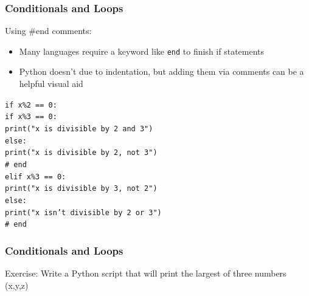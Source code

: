 \documentclass{beamer}
\newcommand{\code}[1]{\texttt{#1}}
\newcommand{\tab}{\hspace*{22pt}}
\begin{document}
\begin{frame}%
	\frametitle{Conditionals and Loops}
	
	\begin{block}{Using \#end comments:}
		\begin{itemize}
			\item Many languages require a keyword like \code{end} to finish if statements
			\item Python doesn't due to indentation, but adding them via comments can be a helpful visual aid
		\end{itemize}
		
		\vspace{5pt}
		
		\code{if x\%2 == 0: \\
				\tab if x\%3 == 0: \\
				\tab \tab print("x is divisible by 2 and 3") \\
				\tab else: \\
				\tab \tab print("x is divisible by 2, not 3") \\
				\tab \# end \\
				elif x\%3 == 0: \\
				\tab print("x is divisible by 3, not 2") \\
				else: \\
				\tab print("x isn't divisible by 2 or 3") \\
				\# end}
		
	\end{block}
	
\end{frame}

\begin{frame}%
	\frametitle{Conditionals and Loops}
	
	\begin{exampleblock}{Exercise:}
		Write a Python script that will print the largest of three numbers (x,y,z)
	\end{exampleblock}
	
\end{frame}
\end{document}
